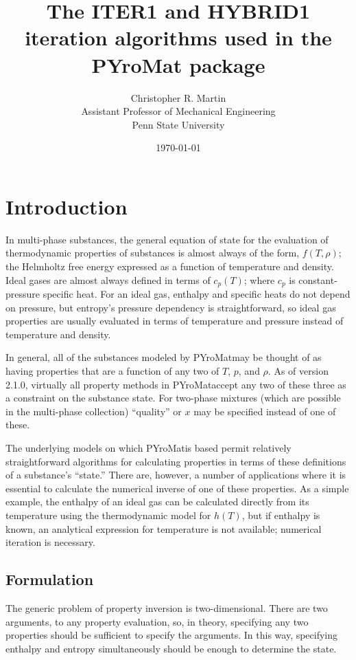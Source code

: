\documentclass{article}
\title{The ITER1 and HYBRID1 iteration algorithms used in the PYroMat package}
\author{Christopher R. Martin\\Assistant Professor of Mechanical Engineering\\Penn State University}
\date{\today}
\def\pm{PYroMat}
\begin{document}
\maketitle

\section{Introduction}

In multi-phase substances, the general equation of state for the evaluation of thermodynamic properties of substances is almost always of the form, $f(T,\rho)$; the Helmholtz free energy expressed as a function of temperature and density.  Ideal gases are almost always defined in terms of $c_p(T)$; where $c_p$ is constant-pressure specific heat.  For an ideal gas, enthalpy and specific heats do not depend on pressure, but entropy's pressure dependency is straightforward, so ideal gas properties are usually evaluated in terms of temperature and pressure instead of temperature and density.

In general, all of the substances modeled by \pm may be thought of as having properties that are a function of any two of $T$, $p$, and $\rho$.  As of version 2.1.0, virtually all property methods in \pm accept any two of these three as a constraint on the substance state.  For two-phase mixtures (which are possible in the multi-phase collection) ``quality'' or $x$ may be specified instead of one of these.

The underlying models on which \pm is based permit relatively straightforward algorithms for calculating properties in terms of these definitions of a substance's ``state.''  There are, however, a number of applications where it is essential to calculate the numerical inverse of one of these properties.  As a simple example, the enthalpy of an ideal gas can be calculated directly from its temperature using the thermodynamic model for $h(T)$, but if enthalpy is known, an analytical expression for temperature is not available; numerical iteration is necessary.

\subsection{Formulation}

The generic problem of property inversion is two-dimensional.  There are two arguments, to any property evaluation, so, in theory, specifying any two properties should be sufficient to specify the arguments.  In this way, specifying enthalpy and entropy simultaneously should be enough to determine the state.  
\end{document}
